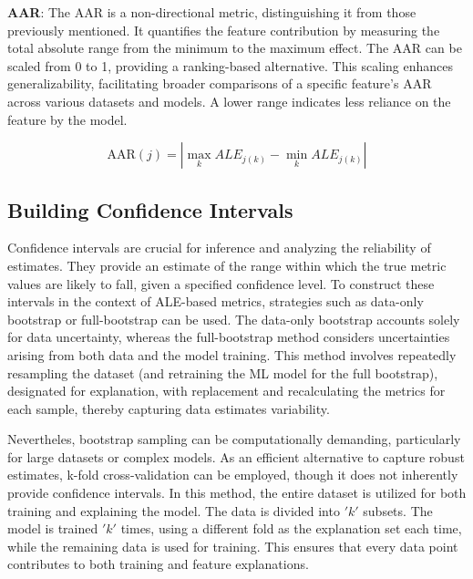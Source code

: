 \textbf{\gls{AAR}}: The \gls{AAR} is a non-directional metric, distinguishing it from those previously mentioned. It quantifies the feature contribution by measuring the total absolute range from the minimum to the maximum effect. The \gls{AAR} can be scaled from 0 to 1, providing a ranking-based alternative. This scaling enhances generalizability, facilitating broader comparisons of a specific feature's \gls{AAR} across various datasets and models. A lower range indicates less reliance on the feature by the model.

\begin{equation}
\label{eq:AAR}
\text{AAR}(j) = \left| \max_{k} ALE_{j(k)} - \min_{k} ALE_{j(k)} \right|
\end{equation}

\subsection{Building Confidence Intervals}

Confidence intervals are crucial for inference and analyzing the reliability of estimates. They provide an estimate of the range within which the true metric values are likely to fall, given a specified confidence level. To construct these intervals in the context of \gls{ALE}-based metrics, strategies such as data-only bootstrap or full-bootstrap can be used. The data-only bootstrap accounts solely for data uncertainty, whereas the full-bootstrap method considers uncertainties arising from both data and the model training. This method involves repeatedly resampling the dataset (and retraining the \gls{ML} model for the full bootstrap), designated for explanation, with replacement and recalculating the metrics for each sample, thereby capturing data estimates variability.

Nevertheles, bootstrap sampling can be computationally demanding, particularly for large datasets or complex models. As an efficient alternative to capture robust estimates, k-fold cross-validation can be employed, though it does not inherently provide confidence intervals. In this method, the entire dataset is utilized for both training and explaining the model. The data is divided into \('k'\) subsets. The model is trained \('k'\) times, using a different fold as the explanation set each time, while the remaining data is used for training. This ensures that every data point contributes to both training and feature explanations.

